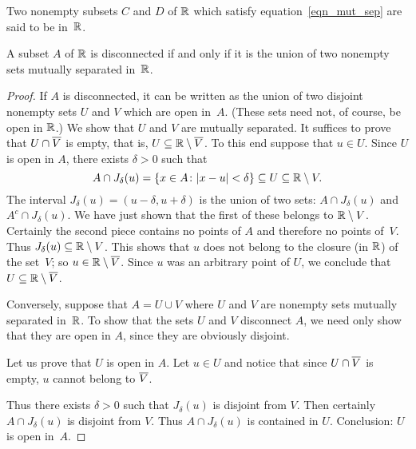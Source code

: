 \begin{defn} Two nonempty subsets $C$ and $D$ of $\mathbb{R}$ which satisfy
equation~\eqref{eqn_mut_sep} are said to be
 in~$\mathbb{R}$.
\end{defn}

\begin{prop}\label{prop_mut_sep} A subset $A$ of $\mathbb{R}$ is disconnected if and only if it is the
union of two nonempty sets mutually separated in~$\mathbb{R}$.
\end{prop}

\begin{proof} If $A$ is disconnected, it can be written as the union of two disjoint nonempty
sets $U$ and $V$ which are open in~$A$.  (These sets need not, of course, be open in $\mathbb{R}$.) We
show that $U$ and $V$ are mutually separated.  It suffices to prove that $U \cap \overline{V}$ is
empty, that is, $U \subseteq \mathbb{R} \setminus \overline{V}$.  To this end suppose that $u \in U$. Since
$U$ is open in $A$, there exists $\delta > 0$ such that
   \[A \cap J_\delta(u) = \{x \in A \colon \lvert x-u\rvert < \delta\} \subseteq U
                             \subseteq \mathbb{R} \setminus V.\]
The interval $J_\delta(u) = (u-\delta,u+\delta)$ is the union of two sets: $A \cap
J_\delta(u)$ and $A^c \cap J_\delta(u)$.  We have just shown that the first of these belongs
to $\mathbb{R} \setminus V$. Certainly the second piece contains no points of $A$ and therefore no
points of~$V$.  Thus $J_\delta(u) \subseteq \mathbb{R} \setminus V$. This shows that $u$ does not
belong to the closure (in $\mathbb{R}$) of the set~$V$; so $u \in \mathbb{R} \setminus \overline{V}$.  Since $u$ was
an arbitrary point of $U$, we conclude that $U \subseteq \mathbb{R} \setminus \overline{V}$.

Conversely, suppose that $A = U \cup V$ where $U$ and $V$ are nonempty sets mutually separated
in~$\mathbb{R}$.  To show that the sets $U$ and $V$ disconnect $A$, we need only show that they are
open in $A$, since they are obviously disjoint.

Let us prove that $U$ is open in $A$.  Let $u \in U$ and notice that since $U \cap \overline{V}$ is
empty, $u$ cannot belong to $\overline{V}$.

Thus there exists $\delta > 0$ such that $J_\delta(u)$ is disjoint from $V$. Then certainly $A
\cap J_\delta(u)$ is disjoint from $V$. Thus $A \cap J_\delta(u)$ is contained in $U$.
Conclusion: $U$ is open in~$A$.
\end{proof}

